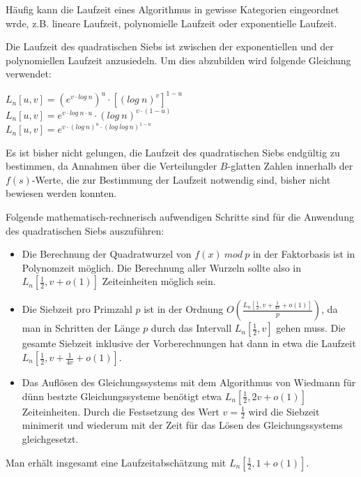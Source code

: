 \documentclass[10pt, bigheadings]{scrartcl}
\begin{document}
Häufig kann die Laufzeit eines Algorithmus in gewisse Kategorien
eingeordnet wrde, z.B. lineare Laufzeit, polynomielle Laufzeit
oder exponentielle Laufzeit.

Die Laufzeit des quadratischen Siebs ist zwischen der exponentiellen
und der polynomiellen Laufzeit anzusiedeln. Um dies abzubilden
wird folgende Gleichung verwendet:
\begin{center}
$L_n[u,v] = (e^{v\cdot log\ n})^u\cdot[(log\ n)^v]^{1-u}$\\
$L_n[u,v] = e^{v\cdot log\ n\cdot u}\cdot(log\ n)^{v\cdot(1-u)}$\\
$L_n[u,v] = e^{v\cdot(log\ n)^u\cdot(log\ log\ n)^{1-u}}$
\end{center}
Es ist bisher nicht gelungen, die Laufzeit des quadratischen
Siebs endgültig zu bestimmen, da Annahmen über die
Verteilungder $B$-glatten Zahlen innerhalb der $f(s)$-Werte,
die zur Bestimmung der Laufzeit notwendig sind, bisher nicht
bewiesen werden konnten.

Folgende mathematisch-rechnerisch aufwendigen Schritte sind für
die Anwendung des quadratischen Siebs auszuführen:
\begin{itemize}

\item Die Berechnung der Quadratwurzel von $f(x)\ mod\ p$ in der
Faktorbasis ist in Polynomzeit möglich. Die
Berechnung aller Wurzeln sollte also in $L_n[\frac{1}{2},v+o(1)]$
Zeiteinheiten möglich sein.

\item Die Siebzeit pro Primzahl $p$ ist in der Ordnung
$O(\frac{L_n[\frac{1}{2}, v+\frac{1}{4v}+o(1)]}{p})$, da
man in Schritten der Länge $p$ durch das Intervall $L_n[\frac{1}{2},v]$
gehen muss. Die gesamte Siebzeit inklusive der Vorberechnungen hat
dann in etwa die Laufzeit $L_n[\frac{1}{2}, v+\frac{1}{4v}+o(1)]$.

\item Das Auflösen des Gleichungssystems mit dem Algorithmus von Wiedmann
für dünn bestzte Gleichungssysteme benötigt etwa $L_n[\frac{1}{2}, 2v+o(1)]$
Zeiteinheiten. Durch die Festsetzung des Wert $v = \frac{1}{2}$ wird die
Siebzeit minimerit und wiederum mit der Zeit für das Lösen des Gleichungssystems
gleichgesetzt.
\end{itemize}

Man erhält insgesamt eine Laufzeitabschätzung mit $L_n[\frac{1}{2}, 1+ o(1)]$.
\end{document}
